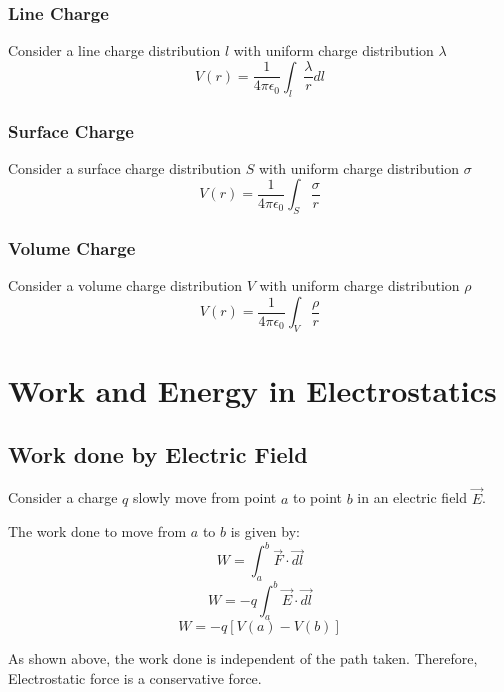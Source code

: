 \documentclass{article}
\begin{document}
\subsubsection{Line Charge}
Consider a line charge distribution $l$ with uniform charge distribution $\lambda$ \\
\[ V(r) = \frac{1}{4\pi\epsilon_0} \int_{l} \frac{\lambda}{r} dl \]

\subsubsection{Surface Charge}
Consider a surface charge distribution $S$ with uniform charge distribution $\sigma$ \\
\[ V(r) = \frac{1}{4 \pi \epsilon_0} \int_{S} \frac{\sigma}{r} \]

\subsubsection{Volume Charge}
Consider a volume charge distribution $V$ with uniform charge distribution $\rho$ \\
\[  V(r) = \frac{1}{4 \pi \epsilon_0} \int_{V} \frac{\rho}{r} \]

\section{Work and Energy in Electrostatics}
\subsection{Work done by Electric Field}
Consider a charge $q$ slowly move from point $a$ to point $b$ in an electric field $\vec{E}$.\\


The work done to move from $a$ to $b$ is given by:
\[ W = \int_{a}^{b} \vec{F} \cdot \vec{dl} \]
\[ W = -q \int_{a}^{b} \vec{E} \cdot \vec{dl} \]
\[ W = -q \left[V(a) - V(b)\right] \]

As shown above, the work done is independent of the path taken. Therefore, Electrostatic force is a conservative force.
\end{document}
